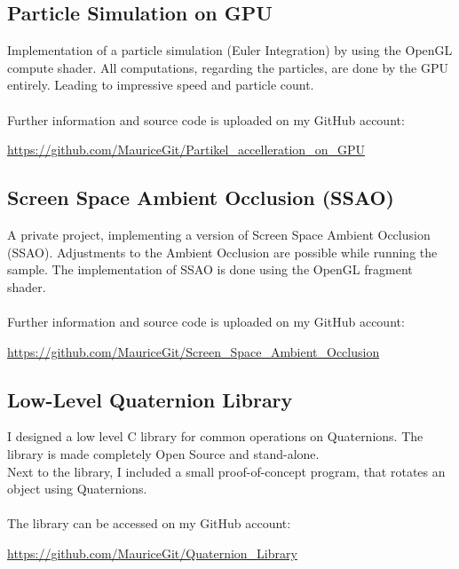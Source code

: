 \documentclass[a4paper, 12pt]{article}
\begin{document}
\subsection{Particle Simulation on GPU}

Implementation of a particle simulation (Euler Integration) by using the OpenGL compute shader.
All computations, regarding the particles, are done by the GPU entirely. Leading to impressive 
speed and particle count.
\\
\\
Further information and source code is uploaded on my GitHub account:

\begin{center}
	\url{https://github.com/MauriceGit/Partikel_accelleration_on_GPU}
\end{center}

\subsection{Screen Space Ambient Occlusion (SSAO)}

A private project, implementing a version of Screen Space Ambient Occlusion (SSAO). Adjustments to the Ambient 
Occlusion are possible while running the sample. The implementation of SSAO is done using the
OpenGL fragment shader.
\\
\\
Further information and source code is uploaded on my GitHub account:

\begin{center}
	\url{https://github.com/MauriceGit/Screen_Space_Ambient_Occlusion}
\end{center}

\subsection{Low-Level Quaternion Library}

I designed a low level C library for common operations on Quaternions. The library is made completely 
Open Source and stand-alone.
\\
Next to the library, I included a small proof-of-concept program, that rotates an object using Quaternions.
\\
\\
The library can be accessed on my GitHub account:

\begin{center}
	\url{https://github.com/MauriceGit/Quaternion_Library}
\end{center}
\end{document}

